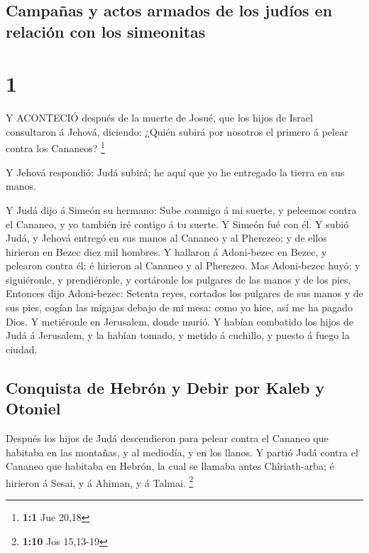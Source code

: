\hypertarget{campauxf1as-y-actos-armados-de-los-juduxedos-en-relaciuxf3n-con-los-simeonitas}{%
\subsection{Campañas y actos armados de los judíos en relación con los
simeonitas}\label{campauxf1as-y-actos-armados-de-los-juduxedos-en-relaciuxf3n-con-los-simeonitas}}

\hypertarget{section}{%
\section{1}\label{section}}

 Y ACONTECIÓ después de la muerte de Josué, que los hijos de
Israel consultaron á Jehová, diciendo: ¿Quién subirá por nosotros el
primero á pelear contra los Cananeos? \footnote{\textbf{1:1} Jue 20,18}

 Y Jehová respondió: Judá subirá; he aquí que yo he
entregado la tierra en sus manos.

 Y Judá dijo á Simeón su hermano: Sube conmigo á mi suerte,
y peleemos contra el Cananeo, y yo también iré contigo á tu suerte. Y
Simeón fué con él.  Y subió Judá, y Jehová entregó en sus
manos al Cananeo y al Pherezeo; y de ellos hirieron en Bezec diez mil
hombres.  Y hallaron á Adoni-bezec en Bezec, y pelearon
contra él: é hirieron al Cananeo y al Pherezeo.  Mas
Adoni-bezec huyó; y siguiéronle, y prendiéronle, y cortáronle los
pulgares de las manos y de los pies.  Entonces dijo
Adoni-bezec: Setenta reyes, cortados los pulgares de sus manos y de sus
pies, cogían las migajas debajo de mi mesa: como yo hice, así me ha
pagado Dios. Y metiéronle en Jerusalem, donde murió.  Y
habían combatido los hijos de Judá á Jerusalem, y la habían tomado, y
metido á cuchillo, y puesto á fuego la ciudad.

\hypertarget{conquista-de-hebruxf3n-y-debir-por-kaleb-y-otoniel}{%
\subsection{Conquista de Hebrón y Debir por Kaleb y
Otoniel}\label{conquista-de-hebruxf3n-y-debir-por-kaleb-y-otoniel}}

 Después los hijos de Judá descendieron para pelear contra
el Cananeo que habitaba en las montañas, y al mediodía, y en los llanos.
 Y partió Judá contra el Cananeo que habitaba en Hebrón, la
cual se llamaba antes Chîriath-arba; é hirieron á Sesai, y á Ahiman, y á
Talmai. \footnote{\textbf{1:10} Jos 15,13-19}

